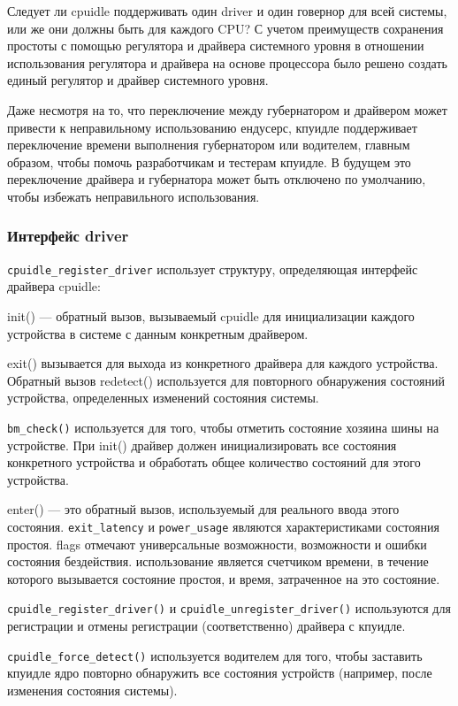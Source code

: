 \documentclass{article}
\begin{document}
Следует ли cpuidle поддерживать один driver и один говернор для всей системы, или же они должны быть для каждого CPU?
С учетом преимуществ сохранения простоты с помощью регулятора и драйвера системного уровня в отношении использования регулятора и драйвера на основе процессора было решено создать единый регулятор и драйвер системного уровня.

Даже несмотря на то, что переключение между губернатором и драйвером может привести к неправильному использованию ендусерс, кпуидле поддерживает переключение времени выполнения губернатором или водителем, главным образом, чтобы помочь разработчикам и тестерам кпуидле. В будущем это переключение драйвера и губернатора может быть отключено по умолчанию, чтобы избежать неправильного использования.

\subsubsection{Интерфейс driver}
\texttt{cpuidle\_register\_driver} использует структуру, определяющая интерфейс драйвера cpuidle:

init() — обратный вызов, вызываемый cpuidle для инициализации каждого устройства в системе с данным конкретным драйвером.

exit() вызывается для выхода из конкретного драйвера для каждого устройства. Обратный вызов redetect() используется для повторного обнаружения состояний устройства, определенных изменений состояния системы.

\texttt{bm\_check()} используется для того, чтобы отметить состояние хозяина шины на устройстве. При init() драйвер должен инициализировать все состояния конкретного устройства и обработать общее количество состояний для этого устройства.



enter() — это обратный вызов, используемый для реального ввода этого состояния. \texttt{exit\_latency} и \texttt{power\_usage} являются характеристиками состояния простоя. flags отмечают универсальные возможности, возможности и ошибки состояния бездействия. использование является счетчиком времени, в течение которого вызывается состояние простоя, и время, затраченное на это состояние.

\texttt{cpuidle\_register\_driver()} и \texttt{cpuidle\_unregister\_driver()} используются для регистрации и отмены регистрации (соответственно) драйвера с кпуидле.

\texttt{cpuidle\_force\_detect()} используется водителем для того, чтобы заставить кпуидле ядро повторно обнаружить все состояния устройств (например, после изменения состояния системы).
\end{document}
